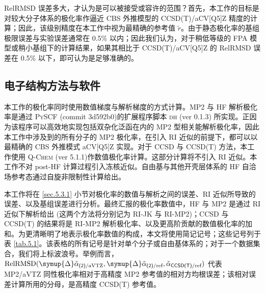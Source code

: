 RelRMSD 误差多大，才认为是可以被接受或容许的范围？首先，本工作的目标是对较大分子体系的极化率作逼近 CBS 外推模型的 CCSD(T)/aCV[Q5]Z 精度的计算；因此，该级别精度在本工作中视为最精确的参考值 $\tilde r$。由于静态极化率的基组极限误差与实验误差通常在 0.5\% 以内\cite{Brakestad-Frediani.JCTC.2020, Rumble-Rumble.CRC.2021}；因此我们认为，对于稍低等级的 FPA 模型或稍小基组下的计算结果，如果其相比于 CCSD(T)/aCV[Q5]Z 的 RelRMSD 误差在 0.5\% 以下，即可认为是足够准确的。


\subsection{电子结构方法与软件}

本工作的极化率同时使用数值梯度与解析梯度的方式计算。MP2 与 HF 解析极化率是通过 \textsc{PySCF} (commit 3d592b0)的扩展程序脚本 \textsc{dh} (ver 0.1.3) 所实现。正因为该程序可以高效地实现包括双杂化泛函在内的 MP2 型相关能解析极化率，因此本工作中涉及到的所有分子的 MP2 极化率，在引入 RI 近似的前提下，都可以以最精确的 CBS 外推模式 aCV[Q5]Z 实现。对于 CCSD 与 CCSD(T) 方法，本工作使用 \textsc{Q-Chem} (ver 5.1.1)作数值极化率计算。这部分计算将不引入 RI 近似。本工作不对 post-HF 计算过程引入冻核近似。自由基与其他开壳层体系的 HF 自洽场参考态通过自旋非限制性计算给出。

本工作将在 \ref{sec.5.3.1} 小节对极化率的数值与解析之间的误差、RI 近似所导致的误差、以及基组误差进行分析。最终汇报的极化率数值中，HF 与 MP2 是通过 RI 近似下解析给出 (这两个方法将分别记为 RI-JK 与 RI-MP2)；CCSD 与 CCSD(T) 的结果将是 RI-MP2 解析极化率、以及更高阶贡献的数值极化率的加和。为更清晰明了地表示极化率数值的构成，本文将使用简记记号；这些记号列于表 \ref{tab.5.1}。该表格的所有记号是针对单个分子或自由基体系的；对于一个数据集合，我们将上标波浪号。举例而言，$\text{RelRMSD} (\symup{\Delta} \tilde \alpha_{\textsf{(2)}/\text{aVTZ}}, \symup{\Delta} \tilde \alpha_{\textsf{(2)}/\text{ref}}, \tilde \alpha_{\textsf{CCSD(T)}/\text{ref}})$ 代表 MP2/aVTZ 同性极化率相对于高精度 MP2 参考值的相对方均根误差；该相对误差计算所用的分母，是高精度 CCSD(T) 参考值。

